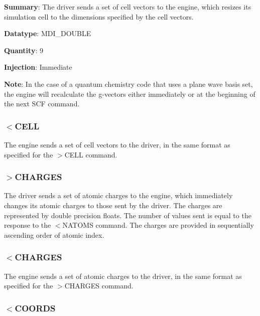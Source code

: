 \begin{DoxyParagraph}{{\bfseries Summary}\-: The driver sends a set of cell vectors to the engine, which resizes its simulation cell to the dimensions specified by the cell vectors.}

\end{DoxyParagraph}
\begin{DoxyParagraph}{{\bfseries Datatype}\-: M\-D\-I\-\_\-\-D\-O\-U\-B\-L\-E}

\end{DoxyParagraph}
\begin{DoxyParagraph}{{\bfseries Quantity}\-: 9}

\end{DoxyParagraph}
\begin{DoxyParagraph}{{\bfseries Injection}\-: Immediate}

\end{DoxyParagraph}
\begin{DoxyParagraph}{{\bfseries Note}\-: In the case of a quantum chemistry code that uses a plane wave basis set, the engine will recalculate the g-\/vectors either immediately or at the beginning of the next S\-C\-F command.}

\end{DoxyParagraph}
\hypertarget{index_recv_cell}{}\subsubsection{$<$\-C\-E\-L\-L}\label{index_recv_cell}
The engine sends a set of cell vectors to the driver, in the same format as specified for the {\ttfamily $>$C\-E\-L\-L} command.\hypertarget{index_send_charges}{}\subsubsection{$>$\-C\-H\-A\-R\-G\-E\-S}\label{index_send_charges}
The driver sends a set of atomic charges to the engine, which immediately changes its atomic charges to those sent by the driver. The charges are represented by double precision floats. The number of values sent is equal to the response to the $<$N\-A\-T\-O\-M\-S command. The charges are provided in sequentially ascending order of atomic index.\hypertarget{index_recv_charges}{}\subsubsection{$<$\-C\-H\-A\-R\-G\-E\-S}\label{index_recv_charges}
The engine sends a set of atomic charges to the driver, in the same format as specified for the {\ttfamily $>$C\-H\-A\-R\-G\-E\-S} command.\hypertarget{index_send_coords}{}\subsubsection{$<$\-C\-O\-O\-R\-D\-S}\label{index_send_coords}

